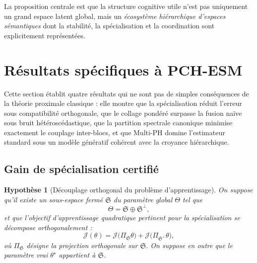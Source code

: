\documentclass[11pt,a4paper]{article}
\newtheorem{assumption}{Hypothèse}[section]
\newcommand{\1}{\mathbf 1}
\begin{document}
La proposition centrale est que la structure cognitive utile n'est pas uniquement un grand espace latent global, mais un \emph{écosystème hiérarchique d'espaces sémantiques} dont la stabilité, la spécialisation et la coordination sont explicitement représentées.








\section{Résultats spécifiques à PCH-ESM}

Cette section établit quatre résultats qui ne sont pas de simples conséquences de la théorie proximale classique :
elle montre que la spécialisation réduit l'erreur sous compatibilité orthogonale,
que le collage pondéré surpasse la fusion naïve sous bruit hétéroscédastique,
que la partition spectrale canonique minimise exactement le couplage inter-blocs,
et que Multi-PH domine l'estimateur standard sous un modèle génératif cohérent avec la croyance hiérarchique.

\subsection{Gain de spécialisation certifié}

\begin{assumption}[Découplage orthogonal du problème d'apprentissage]
On suppose qu'il existe un sous-espace fermé \(\mathfrak S\) du paramètre global \(\Theta\) tel que
\[
\Theta=\mathfrak S\oplus \mathfrak S^\perp,
\]
et que l'objectif d'apprentissage quadratique pertinent pour la spécialisation se décompose orthogonalement :
\[
\mathcal J(\theta)
=
\mathcal J\bigl(\Pi_{\mathfrak S}\theta\bigr)
+
\mathcal J\bigl(\Pi_{\mathfrak S^\perp}\theta\bigr),
\]
où \(\Pi_{\mathfrak S}\) désigne la projection orthogonale sur \(\mathfrak S\).
On suppose en outre que le paramètre vrai \(\theta^\star\) appartient à \(\mathfrak S\).
\end{assumption}
\end{document}
